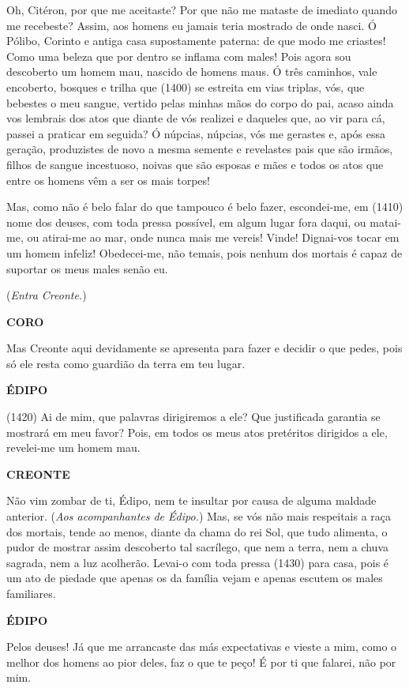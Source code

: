 Oh, Citéron, por que me aceitaste? Por que não me mataste de imediato
quando me recebeste? Assim, aos homens eu jamais teria mostrado de onde
nasci. Ó Pólibo, Corinto e antiga casa supostamente paterna: de que modo
me criastes! Como uma beleza que por dentro se inflama com males! Pois
agora sou descoberto um homem mau, nascido de homens maus. Ó três
caminhos, vale encoberto, bosques e trilha que (1400) se estreita em
vias triplas, vós, que bebestes o meu sangue, vertido pelas minhas mãos
do corpo do pai, acaso ainda vos lembrais dos atos que diante de vós
realizei e daqueles que, ao vir para cá, passei a praticar em seguida? Ó
núpcias, núpcias, vós me gerastes e, após essa geração, produzistes de
novo a mesma semente e revelastes pais que são irmãos, filhos de sangue
incestuoso, noivas que são esposas e mães e todos os atos que entre os
homens vêm a ser os mais torpes!

Mas, como não é belo falar do que tampouco é belo fazer, escondei-me, em
(1410) nome dos deuses, com toda pressa possível, em algum lugar fora
daqui, ou matai-me, ou atirai-me ao mar, onde nunca mais me vereis!
Vinde! Dignai-vos tocar em um homem infeliz! Obedecei-me, não temais,
pois nenhum dos mortais é capaz de suportar os meus males senão eu.

(\emph{Entra Creonte.})

\textbf{CORO}

Mas Creonte aqui devidamente se apresenta para fazer e decidir o que
pedes, pois só ele resta como guardião da terra em teu lugar.

\textbf{ÉDIPO}

(1420) Ai de mim, que palavras dirigiremos a ele? Que justificada
garantia se mostrará em meu favor? Pois, em todos os meus atos
pretéritos dirigidos a ele, revelei-me um homem mau.

\textbf{CREONTE }

Não vim zombar de ti, Édipo, nem te insultar por causa de alguma maldade
anterior. (\emph{Aos acompanhantes de Édipo.}) Mas, se vós não mais
respeitais a raça dos mortais, tende ao menos, diante da chama do rei
Sol, que tudo alimenta, o pudor de mostrar assim descoberto tal
sacrílego, que nem a terra, nem a chuva sagrada, nem a luz acolherão.
Levai-o com toda pressa (1430) para casa, pois é um ato de piedade que
apenas os da família vejam e apenas escutem os males familiares.

\textbf{ÉDIPO}

Pelos deuses! Já que me arrancaste das más expectativas e vieste a mim,
como o melhor dos homens ao pior deles, faz o que te peço! É por ti que
falarei, não por mim.

